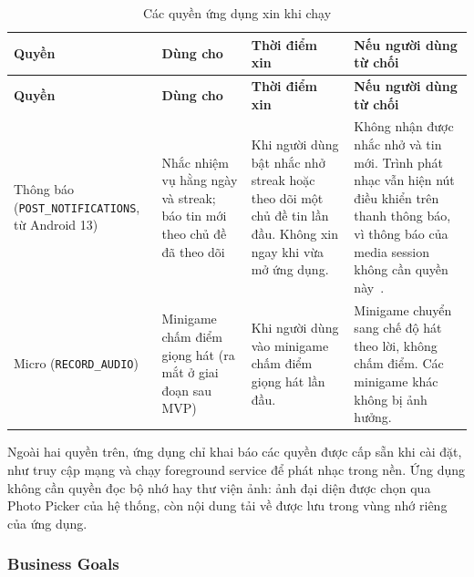 \begingroup
\small
\begin{longtable}{@{}>{\raggedright\arraybackslash}p{2.9cm}>{\raggedright\arraybackslash}p{3.3cm}>{\raggedright\arraybackslash}p{4.4cm}>{\raggedright\arraybackslash}p{4.6cm}@{}}
\caption{Các quyền ứng dụng xin khi chạy}
\label{tab:permissions-runtime} \\
\toprule
\textbf{Quyền} & \textbf{Dùng cho} & \textbf{Thời điểm xin} & \textbf{Nếu người dùng từ chối} \\
\midrule
\endfirsthead
\toprule
\textbf{Quyền} & \textbf{Dùng cho} & \textbf{Thời điểm xin} & \textbf{Nếu người dùng từ chối} \\
\midrule
\endhead
\bottomrule
\endfoot
Thông báo (\texttt{POST\_\allowbreak NOTIFICATIONS}, từ Android 13) &
Nhắc nhiệm vụ hằng ngày và streak; báo tin mới theo chủ đề đã theo dõi &
Khi người dùng bật nhắc nhở streak hoặc theo dõi một chủ đề tin lần đầu. Không xin ngay khi vừa mở ứng dụng. &
Không nhận được nhắc nhở và tin mới. Trình phát nhạc vẫn hiện nút điều khiển trên thanh thông báo, vì thông báo của media session không cần quyền này~\cite{android-notification-permission}. \\
\midrule
Micro (\texttt{RECORD\_\allowbreak AUDIO}) &
Minigame chấm điểm giọng hát (ra mắt ở giai đoạn sau MVP) &
Khi người dùng vào minigame chấm điểm giọng hát lần đầu. &
Minigame chuyển sang chế độ hát theo lời, không chấm điểm. Các minigame khác không bị ảnh hưởng. \\
\end{longtable}
\endgroup

Ngoài hai quyền trên, ứng dụng chỉ khai báo các quyền được cấp sẵn khi cài đặt, như truy cập mạng và chạy foreground service để phát nhạc trong nền.
Ứng dụng không cần quyền đọc bộ nhớ hay thư viện ảnh: ảnh đại diện được chọn qua Photo Picker của hệ thống, còn nội dung tải về được lưu trong vùng nhớ riêng của ứng dụng.

\subsubsection{Business Goals}

